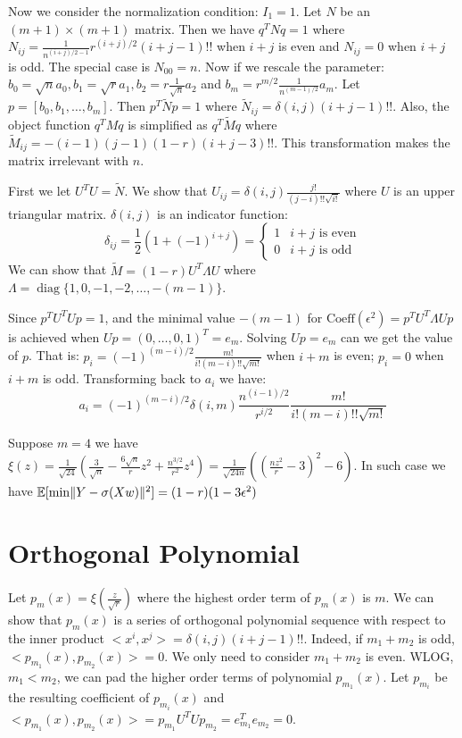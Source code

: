\documentclass{article}
\DeclarePairedDelimiter\norm{\lVert}{\rVert}
\def\E{\mathbb{E}}
\DeclareMathOperator*{\diag}{diag}
\begin{document}
Now we consider the normalization condition: $I_1 = 1$.
Let $N$ be an $(m+1) \times (m+1)$ matrix.
Then we have $q^T N q = 1$ where
$N_{ij} =\frac{1}{n^{(i+j)/2-1}}r^{(i+j) / 2} (i+j -1)!!$
when $i+j$ is even and $N_{ij} = 0$
when $i+j$ is odd.
The special case is $N_{00} = n$.
Now if we rescale the parameter:
$b_0 =  \sqrt{n}a_0, b_1 = \sqrt{r} a_1, b_2 = r \frac{1}{\sqrt{n}}a_2$
and $b_m = r^{m/2} \frac{1}{n^{(m-1)/2}}a_m$.
Let $p = [b_0, b_1, \dots, b_m]$.
Then $p^T \widetilde{N} p =1$ where
$\widetilde{N}_{ij} = \delta(i,j) (i+j -1)!!$.
Also, the object function $q^T M q$ is simplified as $q^T \widetilde{M} q$
where $\widetilde{M}_{ij} =  -(i-1)(j-1)(1-r) (i+j-3)!! $.
This transformation makes the matrix irrelevant with $n$.

First we let $U^T U = \widetilde{N}$.
We show that $U_{ij} = \delta(i,j)\frac{j!}{(j-i)!!\sqrt{i!}}$
where $U$ is an upper triangular matrix.
$\delta(i,j)$ is an indicator function:
\begin{equation}
\delta_{ij} = \frac{1}{2}(1+(-1)^{i+j})=\begin{cases}
1 & i+j \textrm{ is even} \\
0 & i+j \textrm{ is odd}
\end{cases}
\end{equation}
We can show that $\widetilde{M} = (1-r)U^T \Lambda U$ where
$\Lambda = \diag\{1,0, -1, -2, \dots, -(m-1)\}$.

Since $p^T U^T U p = 1$, and the minimal value $-(m-1)$ for
$\textrm{Coeff}(\epsilon^2) = p^T U^T \Lambda U p $ is achieved
when $U p = (0, \dots, 0, 1)^T = e_m$.
Solving $ U p = e_m $ can we get the value of $p$.
That is: $p_i = (-1)^{(m-i)/2} \frac{m!}{i!(m-i)!! \sqrt{m!}} $
when $i+m$ is even; $p_i = 0 $ when $i+m$ is odd.
Transforming back to $a_i$ we have:
\begin{equation}
a_i =(-1)^{(m-i)/2} \delta(i,m) \frac{n^{(i-1)/2}}{r^{i/2}}
\frac{m!}{i!(m-i)!! \sqrt{m!}}
\end{equation}

Suppose  $ m = 4$ we have $ \xi(z) =
\frac{1}{\sqrt{24}}(\frac{3}{\sqrt{n}} - \frac{6\sqrt{n}}{r} z^2 +
\frac{n^{3/2}}{r^2}z^4)  = \frac{1}{\sqrt{24n}}((\frac{nz^2}{r} - 3)^2 - 6)$.
In such case we have $\E[\min \norm{Y - \sigma(Xw)}^2]=(1-r)(1-3\epsilon^2)$
\section{Orthogonal Polynomial}
Let $p_m(x) = \xi(\frac{z}{\sqrt{r}})$
where the highest order term of $p_m(x)$ is $m$.
We can show that $p_m(x)$ is a series of orthogonal polynomial sequence
with respect to the inner product
$<x^i, x^j> = \delta(i,j)(i+j-1)!!$.
Indeed, if $m_1 + m_2$ is odd, $<p_{m_1}(x), p_{m_2}(x)> = 0$.
We only need to consider $m_1 + m_2$ is even. WLOG, $m_1 < m_2$,
we can pad the higher order terms of polynomial $p_{m_1}(x)$.
Let $p_{m_i}$ be the resulting coefficient of $p_{m_i}(x)$
and $<p_{m_1}(x), p_{m_2}(x)> = p_{m_1}U^TUp_{m_2} = e^T_{m_1} e_{m_2} = 0$.
\end{document}
